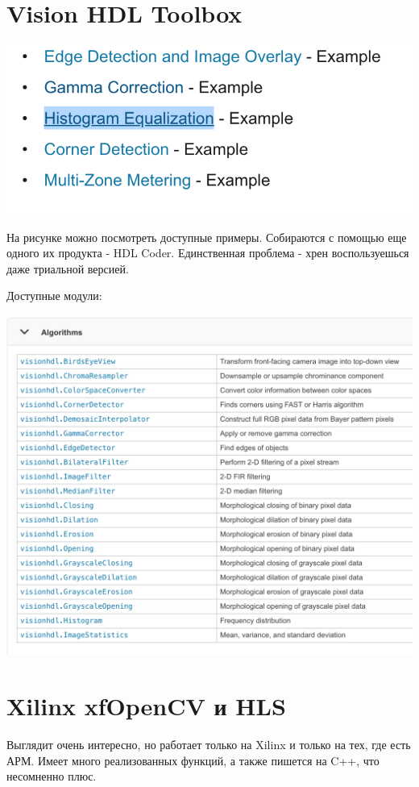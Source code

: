 \documentclass[12pt]{article}
\begin{document}
\section{Vision HDL Toolbox}

\includegraphics[scale=0.25]{img/vision_hdl_examples.png}

На рисунке можно посмотреть доступные примеры. Собираются с помощью
еще одного их продукта - HDL Coder. Единственная проблема - хрен воспользуешься
даже триальной версией.

Доступные модули:

\includegraphics[scale=0.25]{img/vision_hdl_ip_cores.png}


\section{Xilinx xfOpenCV и HLS}

Выглядит очень интересно, но работает только на Xilinx и только на тех, 
где есть АРМ. Имеет много реализованных функций, а также пишется на C++, 
что несомненно плюс.
\end{document}
